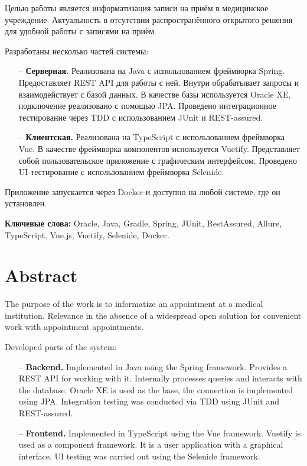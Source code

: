 \documentclass[a4paper,article]{article}
\begin{document}
\begin{sloppypar}
    Целью работы является информатизация записи на приём в медицинское учреждение. Актуальность в отсутствии распространённого открытого решения для удобной работы с записями на приём.

    Разработаны несколько частей системы:

    \begin{itemize}[nolistsep]
		\item[--] \textbf{Серверная.} Реализована на Java с использованием фреймворка Spring. Предоставляет REST API для работы с ней. Внутри обрабатывает запросы и взаимодействует с базой данных. В качестве базы используется Oracle XE, подключение реализовано с помощью JPA. Проведено интеграционное тестирование через TDD с использованием JUnit и REST-assured.
		\item[--] \textbf{Клиентская.} Реализована на TypeScript с использованием фреймворка Vue. В качестве фреймворка компонентов используется Vuetify. Представляет собой пользовательское приложение с графическим интерфейсом. Проведено UI-тестирование с использованием фреймворка Selenide.
	\end{itemize}

	Приложение запускается через Docker и доступно на любой системе, где он установлен.

	\textbf{Ключевые слова:} Oracle, Java, Gradle, Spring, JUnit, RestAssured, Allure, TypeScript, Vue.js, Vuetify, Selenide, Docker.


    \newpage

    \section*{Abstract}
    

    The purpose of the work is to informatize an appointment at a medical institution. Relevance in the absence of a widespread open solution for convenient work with appointment appointments.

    Developed parts of the system:

    \begin{itemize}[nolistsep]
        \item[--] \textbf{Backend.} Implemented in Java using the Spring framework. Provides a REST API for working with it. Internally processes queries and interacts with the database. Oracle XE is used as the base, the connection is implemented using JPA. Integration testing was conducted via TDD using JUnit and REST-assured.
        \item[--] \textbf{Frontend.} Implemented in TypeScript using the Vue framework. Vuetify is used as a component framework. It is a user application with a graphical interface. UI testing was carried out using the Selenide framework.
    \end{itemize}


\end{sloppypar}
\end{document}
